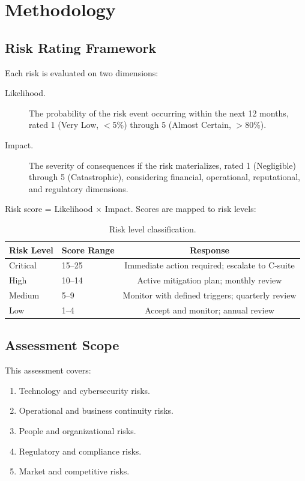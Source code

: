\documentclass[
    language=english,
    doctype=risk-assessment,
    institution=none,
]{../../omnilatex}
\begin{document}
\section{Methodology}

\subsection{Risk Rating Framework}

Each risk is evaluated on two dimensions:

\begin{description}
    \item[Likelihood.] The probability of the risk event occurring within
        the next 12 months, rated 1 (Very Low, $<$5\%) through 5 (Almost
        Certain, $>$80\%).
    \item[Impact.] The severity of consequences if the risk materializes,
        rated 1 (Negligible) through 5 (Catastrophic), considering
        financial, operational, reputational, and regulatory dimensions.
\end{description}

Risk score = Likelihood $\times$ Impact. Scores are mapped to risk levels:

\begin{table}[h]
    \centering
    \begin{tabular}{llc}
        \toprule
        \textbf{Risk Level} & \textbf{Score Range} & \textbf{Response} \\
        \midrule
        Critical  & 15--25 & Immediate action required; escalate to C-suite \\
        High      & 10--14 & Active mitigation plan; monthly review \\
        Medium    & 5--9   & Monitor with defined triggers; quarterly review \\
        Low       & 1--4   & Accept and monitor; annual review \\
        \bottomrule
    \end{tabular}
    \caption{Risk level classification.}
\end{table}

\subsection{Assessment Scope}

This assessment covers:

\begin{enumerate}
    \item Technology and cybersecurity risks.
    \item Operational and business continuity risks.
    \item People and organizational risks.
    \item Regulatory and compliance risks.
    \item Market and competitive risks.
\end{enumerate}
\end{document}
